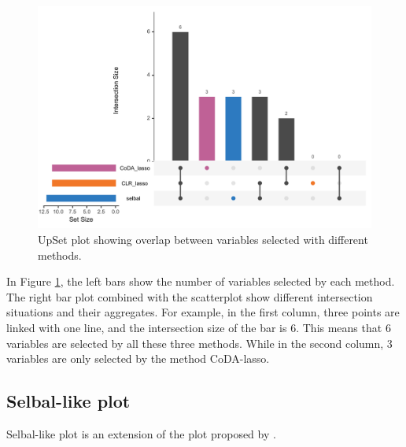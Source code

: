 \documentclass[openany]{book}
\newenvironment{Shaded}{\begin{snugshade}}{\end{snugshade}}
\newcommand{\KeywordTok}[1]{\textcolor[rgb]{0.13,0.29,0.53}{\textbf{#1}}}
\newcommand{\DataTypeTok}[1]{\textcolor[rgb]{0.13,0.29,0.53}{#1}}
\newcommand{\StringTok}[1]{\textcolor[rgb]{0.31,0.60,0.02}{#1}}
\newcommand{\CommentTok}[1]{\textcolor[rgb]{0.56,0.35,0.01}{\textit{#1}}}
\newcommand{\OperatorTok}[1]{\textcolor[rgb]{0.81,0.36,0.00}{\textbf{#1}}}
\newcommand{\NormalTok}[1]{#1}
\begin{document}
\begin{figure}

{\centering \includegraphics[width=1\linewidth]{./Generated_plots/upsetCD-1} 

}

\caption{UpSet plot showing overlap between variables selected with different methods.}\label{fig:upsetCD}
\end{figure}

In Figure \ref{fig:upsetCD}, the left bars show the number of variables
selected by each method. The right bar plot combined with the
scatterplot show different intersection situations and their aggregates.
For example, in the first column, three points are linked with one line,
and the intersection size of the bar is 6. This means that 6 variables
are selected by all these three methods. While in the second column, 3
variables are only selected by the method CoDA-lasso.

\subsection{Selbal-like plot}\label{selbal-like-plot}

Selbal-like plot is an extension of the plot proposed by
\citet{rivera2018balances}.

\begin{Shaded}
\end{Shaded}
\end{document}
